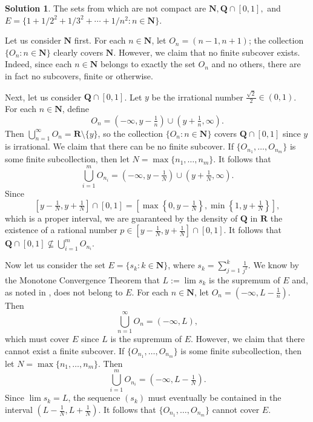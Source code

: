 \documentclass[12pt]{article}
\theoremstyle{definition}
\theoremstyle{exercise}
\theoremstyle{solution}
\newtheorem*{solution}{Solution}
\newcommand{\N}{\mathbf{N}}
\newcommand{\Q}{\mathbf{Q}}
\newcommand{\R}{\mathbf{R}}
\begin{document}
\begin{solution}
    The sets from  which are not compact are \( \N, \Q \cap [0, 1], \) and \( E = \{ 1 + 1/2^2 + 1/3^2 + \cdots + 1/n^2 : n \in \N \} \).

    Let us consider \( \N \) first. For each \( n \in \N \), let \( O_n = \left( n - 1, n + 1 \right) \); the collection \( \{ O_n : n \in \N \} \) clearly covers \( \N \). However, we claim that no finite subcover exists. Indeed, since each \( n \in \N \) belongs to exactly the set \( O_n \) and no others, there are in fact no subcovers, finite or otherwise.

    Next, let us consider \( \Q \cap [0, 1] \). Let \( y \) be the irrational number \( \tfrac{\sqrt{2}}{2} \in (0, 1) \). For each \( n \in \N \), define
    \[
        O_n = \left( -\infty, y - \tfrac{1}{n} \right) \cup \left( y + \tfrac{1}{n}, \infty \right).
    \]
    Then \( \bigcup_{n=1}^{\infty} O_n = \R \setminus \{ y \} \), so the collection \( \{ O_n : n \in \N \} \) covers \( \Q \cap [0, 1] \) since \( y \) is irrational. We claim that there can be no finite subcover. If \( \{ O_{n_1}, \ldots, O_{n_m} \} \) is some finite subcollection, then let \( N = \max \{ n_1, \ldots, n_m \} \). It follows that
    \[
        \bigcup_{i=1}^m O_{n_i} = \left( -\infty, y - \tfrac{1}{N} \right) \cup \left( y + \tfrac{1}{N}, \infty \right).
    \]
    Since
    \[
        \left[ y - \tfrac{1}{N}, y + \tfrac{1}{N} \right] \cap [0, 1] = \left[ \max \left\{ 0, y - \tfrac{1}{N} \right\}, \min \left\{ 1, y + \tfrac{1}{N} \right\} \right],
    \]
    which is a proper interval, we are guaranteed by the density of \( \Q \) in \( \R \) the existence of a rational number \( p \in \left[ y - \tfrac{1}{N}, y + \tfrac{1}{N} \right] \cap [0, 1] \). It follows that \( \Q \cap [0, 1] \not\subseteq \bigcup_{i=1}^m O_{n_i} \).

    Now let us consider the set \( E = \{ s_k : k \in \N \} \), where \( s_k = \sum_{j=1}^k \tfrac{1}{j^2} \). We know by the Monotone Convergence Theorem that \( L := \lim s_k \) is the supremum of \( E \) and, as noted in , does not belong to \( E \). For each \( n \in \N \), let \( O_n = \left( -\infty, L - \tfrac{1}{n} \right) \). Then
    \[
        \bigcup_{n=1}^{\infty} O_n = (-\infty, L),
    \]
    which must cover \( E \) since \( L \) is the supremum of \( E \). However, we claim that there cannot exist a finite subcover. If \( \{ O_{n_1}, \ldots, O_{n_m} \} \) is some finite subcollection, then let \( N = \max \{ n_1, \ldots, n_m \} \). Then
    \[
        \bigcup_{i=1}^m O_{n_i} = \left( -\infty, L - \tfrac{1}{N} \right).
    \]
    Since \( \lim s_k = L \), the sequence \( (s_k) \) must eventually be contained in the interval \( \left( L - \tfrac{1}{N}, L + \tfrac{1}{N} \right) \). It follows that \( \{ O_{n_1}, \ldots, O_{n_m} \} \) cannot cover \( E \).
\end{solution}
\end{document}
